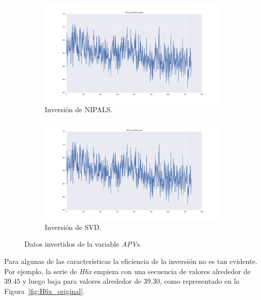 \documentclass[11pt,spanish,listoffigures,listoftables]{tfgetsinf}
\begin{document}
    \begin{figure}[H]
        \centering
        \begin{subfigure}[h]{0.49\textwidth}
            \centering
            \includegraphics[width=\textwidth]{APVs_inverted_nipals.png}
            \caption{Inversión de NIPALS.}
            \label{fig:APVs_inverted_nipals}
        \end{subfigure}
        \begin{subfigure}[h]{0.49\textwidth}
            \centering
            \includegraphics[width=\textwidth]{APVs_inverted_svd.png}
            \caption{Inversión de SVD.}
            \label{fig:APVs_inverted_svd}
        \end{subfigure}
        \caption{Datos invertidos de la variable {\em APVs}.}
        \label{fig:APVs_inverted}
    \end{figure}    
    
    Para algunas de las características la eficiencia de la inversión no es tan evidente. Por ejemplo, la serie de {\em H6x} empieza con una secuencia de valores alrededor de \(39.45\) y luego baja para valores alrededor de \(39.30\), como representado en la Figura~\ref{fig:H6x_original}. 
    
\end{document}
